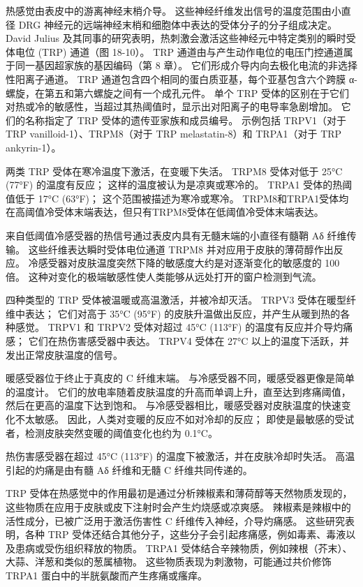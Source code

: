 热感觉由表皮中的游离神经末梢介导。 这些神经纤维发出信号的温度范围由小直径 DRG 神经元的远端神经末梢和细胞体中表达的受体分子的分子组成决定。 David Julius 及其同事的研究表明，热刺激会激活这些神经元中特定类别的瞬时受体电位 (TRP) 通道（图 18-10）。 TRP 通道由与产生动作电位的电压门控通道属于同一基因超家族的基因编码（第 8 章）。 它们形成介导内向去极化电流的非选择性阳离子通道。 TRP 通道包含四个相同的蛋白质亚基，每个亚基包含六个跨膜 α-螺旋，在第五和第六螺旋之间有一个成孔元件。 单个 TRP 受体的区别在于它们对热或冷的敏感性，当超过其热阈值时，显示出对阳离子的电导率急剧增加。 它们的名称指定了 TRP 受体的遗传亚家族和成员编号。 示例包括 TRPV1（对于 TRP vanilloid-1）、TRPM8（对于 TRP melastatin-8）和 TRPA1（对于 TRP ankyrin-1）。

两类 TRP 受体在寒冷温度下激活，在变暖下失活。 TRPM8 受体对低于 25°C (77°F) 的温度有反应； 这样的温度被认为是凉爽或寒冷的。 TRPA1 受体的热阈值低于 17°C (63°F)； 这个范围被描述为寒冷或寒冷。 TRPM8和TRPA1受体均在高阈值冷受体末端表达，但只有TRPM8受体在低阈值冷受体末端表达。

来自低阈值冷感受器的热信号通过表皮内具有无髓末端的小直径有髓鞘 Aδ 纤维传输。 这些纤维表达瞬时受体电位通道 TRPM8 并对应用于皮肤的薄荷醇作出反应。 冷感受器对皮肤温度突然下降的敏感度大约是对逐渐变化的敏感度的 100 倍。 这种对变化的极端敏感性使人类能够从远处打开的窗户检测到气流。

四种类型的 TRP 受体被温暖或高温激活，并被冷却灭活。 TRPV3 受体在暖型纤维中表达； 它们对高于 35°C (95°F) 的皮肤升温做出反应，并产生从暖到热的各种感觉。 TRPV1 和 TRPV2 受体对超过 45°C (113°F) 的温度有反应并介导灼痛感； 它们在热伤害感受器中表达。 TRPV4 受体在 27°C 以上的温度下活跃，并发出正常皮肤温度的信号。

暖感受器位于终止于真皮的 C 纤维末端。 与冷感受器不同，暖感受器更像是简单的温度计。 它们的放电率随着皮肤温度的升高而单调上升，直至达到疼痛阈值，然后在更高的温度下达到饱和。 与冷感受器相比，暖感受器对皮肤温度的快速变化不太敏感。 因此，人类对变暖的反应不如对冷却的反应； 即使是最敏感的受试者，检测皮肤突然变暖的阈值变化也约为 0.1°C。

热伤害感受器在超过 45°C (113°F) 的温度下被激活，并在皮肤冷却时失活。 高温引起的灼痛是由有髓 Aδ 纤维和无髓 C 纤维共同传递的。

TRP 受体在热感觉中的作用最初是通过分析辣椒素和薄荷醇等天然物质发现的，这些物质在应用于皮肤或皮下注射时会产生灼烧感或凉爽感。 辣椒素是辣椒中的活性成分，已被广泛用于激活伤害性 C 纤维传入神经，介导灼痛感。 这些研究表明，各种 TRP 受体还结合其他分子，这些分子会引起疼痛感，例如毒素、毒液以及患病或受伤组织释放的物质。 TRPA1 受体结合辛辣物质，例如辣根（芥末）、大蒜、洋葱和类似的葱属植物。 这些物质表现为刺激物，可能通过共价修饰 TRPA1 蛋白中的半胱氨酸而产生疼痛或瘙痒。

